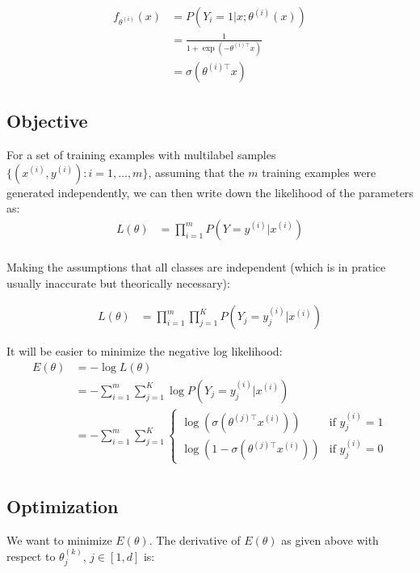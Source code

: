 \begin{align}
	f_{\theta^{(i)}}(x) 
	&= P(Y_i = 1 | x; \theta^{(i)}(x)) \\
	&= \frac{1}{1 + \exp(-\theta^{(i)\top} x)}\\
	&= \sigma(\theta^{(i)\top} x)
\end{align}




\subsection{Objective}


For a set of training examples with multilabel samples $\{ (x^{(i)}, y^{(i)}) : i=1,\ldots,m\}$, assuming that the $m$ training examples were generated independently, we can then write down the likelihood of the parameters as:
\begin{align}
	L(\theta) &= \prod_{i=1}^m P(Y=y^{(i)} | x^{(i)} ) \\
\end{align}

Making the assumptions that all classes are independent (which is in pratice usually inaccurate but theorically necessary):

\begin{align}
	L(\theta) &= \prod_{i=1}^m \prod_{j=1}^K P(Y_j=y_j^{(i)} | x^{(i)}) 
\end{align}


It will be easier to minimize the negative log likelihood:
\begin{align}
	E(\theta) &=  - \log L(\theta) \\
			  &= - \sum_{i=1}^m \sum_{j=1}^K \log  P(Y_j=y_j^{(i)} | x^{(i)}) \\
  			  &= -  \sum_{i=1}^m \sum_{j=1}^K
  			  	\left\{
				    \begin{array}{ll}
				        \log (\sigma(\theta^{(j)\top} x^{(i)})) & \mbox{if } y_j^{(i)} =1 \\
				        \log (1 - \sigma(\theta^{(j)\top} x^{(i)})) & \mbox{if } y_j^{(i)} =0 
				    \end{array}
				\right. \\
\end{align}


\subsection*{Optimization}

We want to minimize $E(\theta)$. The derivative of $E(\theta)$ as given above with respect to $\theta_j^{(k)}$, $j \in [1,d]$ is:

